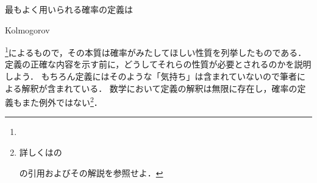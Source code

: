 \documentclass[main.tex]{subfiles}
\begin{document}
最もよく用いられる確率の定義は\begin{german}Kolmogorov\end{german}\footnote{%
}によるもので，その本質は確率がみたしてほしい性質を列挙したものである．
定義の正確な内容を示す前に，どうしてそれらの性質が必要とされるのかを説明しよう．
もちろん定義にはそのような「気持ち」は含まれていないので筆者による解釈が含まれている．
数学において定義の解釈は無限に存在し，確率の定義もまた例外ではない\footnote{%
詳しくはの\begin{german}\end{german}の引用およびその解説を参照せよ．}．
\end{document}
